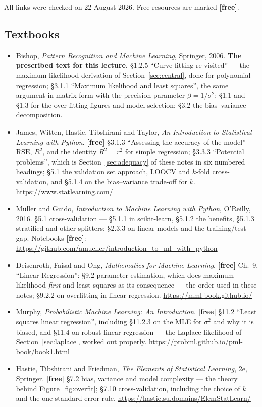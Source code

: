 \documentclass[11pt]{article}
\begin{document}
All links were checked on 22 August 2026. Free resources are marked
\textbf{[free]}.

\subsection*{Textbooks}

\begin{itemize}[leftmargin=*]
  \item Bishop, \emph{Pattern Recognition and Machine Learning}, Springer,
    2006. \textbf{The prescribed text for this lecture.} \S1.2.5 ``Curve
    fitting re-visited'' --- the maximum likelihood derivation of
    Section~\ref{sec:central}, done for polynomial regression; \S3.1.1
    ``Maximum likelihood and least squares'', the same argument in matrix form
    with the precision parameter $\beta = 1/\sigma^2$; \S1.1 and \S1.3 for the
    over-fitting figures and model selection; \S3.2 the bias--variance
    decomposition.
  \item James, Witten, Hastie, Tibshirani and Taylor, \emph{An Introduction to
    Statistical Learning with Python}. \textbf{[free]} \S3.1.3 ``Assessing the
    accuracy of the model'' --- $\mathrm{RSE}$, $R^2$, and the identity
    $R^2 = r^2$ for simple regression; \S3.3.3 ``Potential problems'', which is
    Section~\ref{sec:adequacy} of these notes in six numbered headings;
    \S5.1 the validation set approach, LOOCV and $k$-fold cross-validation, and
    \S5.1.4 on the bias--variance trade-off for $k$.
    \url{https://www.statlearning.com/}
  \item M\"uller and Guido, \emph{Introduction to Machine Learning with
    Python}, O'Reilly, 2016. \S5.1 cross-validation --- \S5.1.1 in
    scikit-learn, \S5.1.2 the benefits, \S5.1.3 stratified and other
    splitters; \S2.3.3 on linear models and the training/test gap. Notebooks
    \textbf{[free]}:
    \url{https://github.com/amueller/introduction_to_ml_with_python}
  \item Deisenroth, Faisal and Ong, \emph{Mathematics for Machine Learning}.
    \textbf{[free]} Ch.~9, ``Linear Regression'': \S9.2 parameter estimation,
    which does maximum likelihood \emph{first} and least squares as its
    consequence --- the order used in these notes; \S9.2.2 on overfitting in
    linear regression.
    \url{https://mml-book.github.io/}
  \item Murphy, \emph{Probabilistic Machine Learning: An Introduction}.
    \textbf{[free]} \S11.2 ``Least squares linear regression'', including
    \S11.2.3 on the MLE for $\sigma^2$ and why it is biased, and \S11.4 on
    robust linear regression --- the Laplace likelihood of
    Section~\ref{sec:laplace}, worked out properly.
    \url{https://probml.github.io/pml-book/book1.html}
  \item Hastie, Tibshirani and Friedman, \emph{The Elements of Statistical
    Learning}, 2e, Springer. \textbf{[free]} \S7.2 bias, variance and model
    complexity --- the theory behind Figure~\ref{fig:overfit}; \S7.10
    cross-validation, including the choice of $k$ and the one-standard-error
    rule.
    \url{https://hastie.su.domains/ElemStatLearn/}
\end{itemize}
\end{document}
